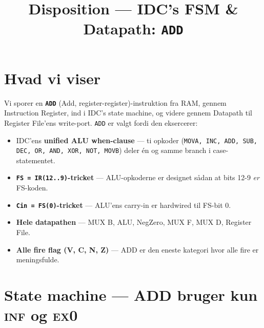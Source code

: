 \documentclass[11pt,a4paper]{article}
\title{\vspace{-1em}\textcolor{accent}{\Large Disposition --- IDC's FSM \& Datapath: \texttt{ADD}}}
\author{}
\date{}
\begin{document}
\maketitle
\vspace{-3em}

\section*{Hvad vi viser}

Vi sporer en \textbf{\texttt{ADD}} (Add, register-register)-instruktion
fra RAM, gennem Instruction Register, ind i IDC's state machine,
og videre gennem Datapath til Register File'ens write-port.
\texttt{ADD} er valgt fordi den eksercerer:

\begin{itemize}
  \item IDC'ens \textbf{unified ALU when-clause} --- ti opkoder (\texttt{MOVA, INC, ADD, SUB, DEC, OR, AND, XOR, NOT, MOVB})
        deler én og samme branch i case-statementet.
  \item \textbf{\texttt{FS = IR(12..9)}-tricket} --- ALU-opkoderne er designet sådan at bits 12-9 \emph{er} FS-koden.
  \item \textbf{\texttt{Cin = FS(0)}-tricket} --- ALU'ens carry-in er hardwired til FS-bit 0.
  \item \textbf{Hele datapathen} --- MUX B, ALU, NegZero, MUX F, MUX D, Register File.
  \item \textbf{Alle fire flag (V, C, N, Z)} --- ADD er den eneste kategori hvor alle fire er meningsfulde.
\end{itemize}

\section*{State machine --- ADD bruger kun \textsc{inf} og \textsc{ex0}}

\begin{center}
\end{center}
\end{document}
